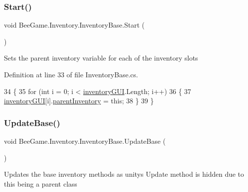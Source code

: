 \subsubsection{\texorpdfstring{Start()}{Start()}}
{\footnotesize\ttfamily void Bee\+Game.\+Inventory.\+Inventory\+Base.\+Start (\begin{DoxyParamCaption}{ }\end{DoxyParamCaption})\hspace{0.3cm}{\ttfamily [private]}}



Sets the parent inventory variable for each of the inventory slots 



Definition at line 33 of file Inventory\+Base.\+cs.


\begin{DoxyCode}
34         \{
35             \textcolor{keywordflow}{for} (\textcolor{keywordtype}{int} i = 0; i < \hyperlink{class_bee_game_1_1_inventory_1_1_inventory_base_a48dcba7ad7bfa1bed8c9ae290fb32857}{inventoryGUI}.Length; i++)
36             \{
37                 \hyperlink{class_bee_game_1_1_inventory_1_1_inventory_base_a48dcba7ad7bfa1bed8c9ae290fb32857}{inventoryGUI}[i].\hyperlink{class_bee_game_1_1_inventory_1_1_inventory_slot_a06c37b35f2512ee2f0652a93129808e4}{parentInventory} = \textcolor{keyword}{this};
38             \}
39         \}
\end{DoxyCode}
\mbox{\label{class_bee_game_1_1_inventory_1_1_inventory_base_aa1a965cf7ba9e04b22a4ef85ad133854}} 
\subsubsection{\texorpdfstring{Update\+Base()}{UpdateBase()}}
{\footnotesize\ttfamily void Bee\+Game.\+Inventory.\+Inventory\+Base.\+Update\+Base (\begin{DoxyParamCaption}{ }\end{DoxyParamCaption})\hspace{0.3cm}{\ttfamily [protected]}}



Updates the base inventory methods as unitys Update method is hidden due to this being a parent class 



